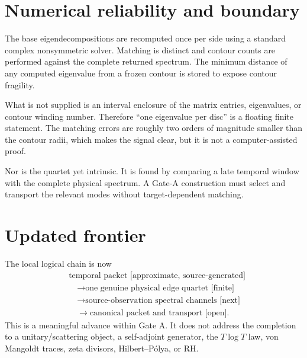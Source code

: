 \documentclass[12pt]{article}
\theoremstyle{remark}
\begin{document}
\section{Numerical reliability and boundary}

The base eigendecompositions are recomputed once per side using a standard
complex nonsymmetric solver.  Matching is distinct and contour counts are
performed against the complete returned spectrum.  The minimum distance of
any computed eigenvalue from a frozen contour is stored to expose contour
fragility.

What is not supplied is an interval enclosure of the matrix entries,
eigenvalues, or contour winding number.  Therefore ``one eigenvalue per
disc'' is a floating finite statement.  The matching errors are roughly two
orders of magnitude smaller than the contour radii, which makes the signal
clear, but it is not a computer-assisted proof.

Nor is the quartet yet intrinsic.  It is found by comparing a late temporal
window with the complete physical spectrum.  A Gate-A construction must
select and transport the relevant modes without target-dependent matching.

\section{Updated frontier}

The local logical chain is now
\begin{equation*}
 \begin{aligned}
 &\text{temporal packet [approximate, source-generated]}\\
 &\quad\longrightarrow\text{one genuine physical edge quartet [finite]}\\
 &\quad\longrightarrow\text{source-observation spectral channels [next]}\\
 &\quad\longrightarrow\text{canonical packet and transport [open]}.
 \end{aligned}
\end{equation*}
This is a meaningful advance within Gate A.  It does not address the
completion to a unitary/scattering object, a self-adjoint generator, the
$T\log T$ law, von Mangoldt traces, zeta divisors, Hilbert--P\'olya, or RH.



\end{document}

